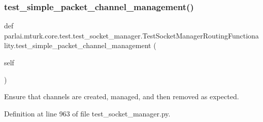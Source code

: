 \subsubsection{\texorpdfstring{test\+\_\+simple\+\_\+packet\+\_\+channel\+\_\+management()}{test\_simple\_packet\_channel\_management()}}
{\footnotesize\ttfamily def parlai.\+mturk.\+core.\+test.\+test\+\_\+socket\+\_\+manager.\+Test\+Socket\+Manager\+Routing\+Functionality.\+test\+\_\+simple\+\_\+packet\+\_\+channel\+\_\+management (\begin{DoxyParamCaption}\item[{}]{self }\end{DoxyParamCaption})}

\begin{DoxyVerb}Ensure that channels are created, managed, and then removed as expected.
\end{DoxyVerb}
 

Definition at line 963 of file test\+\_\+socket\+\_\+manager.\+py.


